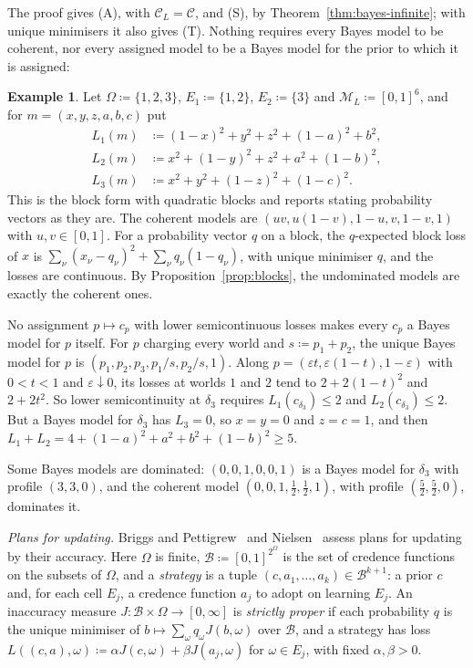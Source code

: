 \documentclass[11pt]{article}
\theoremstyle{definition}
\newtheorem{example}[theorem]{Example}
\theoremstyle{remark}
\newcommand{\M}{\mathcal M}
\newcommand{\C}{\mathcal C}
\begin{document}
The proof gives (A), with $\C_L=\C$, and (S), by Theorem~\ref{thm:bayes-infinite}; with unique minimisers it also gives (T). Nothing requires every Bayes model to be coherent, nor every assigned model to be a Bayes model for the prior to which it is assigned:
\begin{example}\label{ex:conditional}
Let $\Omega\coloneqq\{1,2,3\}$, $E_1\coloneqq\{1,2\}$, $E_2\coloneqq\{3\}$ and $\M_L\coloneqq[0,1]^6$, and for $m=(x,y,z,a,b,c)$ put
\[
\begin{aligned}
L_1(m)&\coloneqq (1-x)^2+y^2+z^2+(1-a)^2+b^2,\\
L_2(m)&\coloneqq x^2+(1-y)^2+z^2+a^2+(1-b)^2,\\
L_3(m)&\coloneqq x^2+y^2+(1-z)^2+(1-c)^2.
\end{aligned}
\]
This is the block form with quadratic blocks and reports stating probability vectors as they are. The coherent models are $(uv,u(1-v),1-u,v,1-v,1)$ with $u,v\in[0,1]$. For a probability vector $q$ on a block, the $q$-expected block loss of $x$ is $\sum_\nu(x_\nu-q_\nu)^2+\sum_\nu q_\nu(1-q_\nu)$, with unique minimiser $q$, and the losses are continuous. By Proposition~\ref{prop:blocks}, the undominated models are exactly the coherent ones.

No assignment $p\mapsto c_p$ with lower semicontinuous losses makes every $c_p$ a Bayes model for $p$ itself. For $p$ charging every world and $s\coloneqq p_1+p_2$, the unique Bayes model for $p$ is $(p_1,p_2,p_3,p_1/s,p_2/s,1)$. Along $p=(\varepsilon t,\varepsilon(1-t),1-\varepsilon)$ with $0<t<1$ and $\varepsilon\downarrow0$, its losses at worlds $1$ and $2$ tend to $2+2(1-t)^2$ and $2+2t^2$. So lower semicontinuity at $\delta_3$ requires $L_1(c_{\delta_3})\le2$ and $L_2(c_{\delta_3})\le2$. But a Bayes model for $\delta_3$ has $L_3=0$, so $x=y=0$ and $z=c=1$, and then $L_1+L_2=4+(1-a)^2+a^2+b^2+(1-b)^2\ge5$.

Some Bayes models are dominated: $(0,0,1,0,0,1)$ is a Bayes model for $\delta_3$ with profile $(3,3,0)$, and the coherent model $(0,0,1,\frac12,\frac12,1)$, with profile $(\frac52,\frac52,0)$, dominates it.
\end{example}

\emph{Plans for updating.} Briggs and Pettigrew~\cite{BP20} and Nielsen~\cite{Nielsen21} assess plans for updating by their accuracy. Here $\Omega$ is finite, $\mathcal B\coloneqq[0,1]^{2^\Omega}$ is the set of credence functions on the subsets of $\Omega$, and a \emph{strategy} is a tuple $(c,a_1,\dots,a_k)\in\mathcal B^{k+1}$: a prior $c$ and, for each cell $E_j$, a credence function $a_j$ to adopt on learning $E_j$. An inaccuracy measure $J:\mathcal B\times\Omega\to[0,\infty]$ is \emph{strictly proper} if each probability $q$ is the unique minimiser of $b\mapsto\sum_\omega q_\omega J(b,\omega)$ over $\mathcal B$, and a strategy has loss $L((c,a),\omega)\coloneqq\alpha J(c,\omega)+\beta J(a_j,\omega)$ for $\omega\in E_j$, with fixed $\alpha,\beta>0$.
\end{document}
